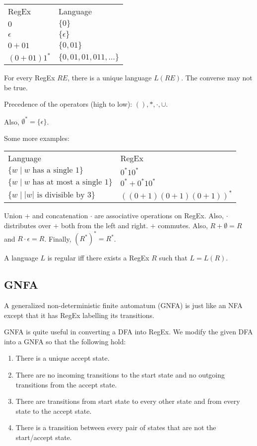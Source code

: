 \documentclass{article}
\begin{document}
\renewcommand*{\arraystretch}{1.4}  
\begin{center}
\begin{tabular}{ l  l  }
  RegEx & Language \\
  $0$ & $\{0 \}$ \\
  $\epsilon$ & $\{\epsilon\}$ \\
  $0+ 01$ & $\{0, 01\}$ \\
  $(0+01)1^{*}$ & $\{ 0, 01, 01, 011, \ldots \}$
  \end{tabular}
\end{center}

For every RegEx $RE$, there is a unique language $L(RE)$. The converse may not be true.

Precedence of the operators (high to low): $( ), *, \cdot, \cup$.

Also, $\emptyset^{*} = \{ \epsilon \}$.

Some more examples:

\renewcommand*{\arraystretch}{1.4}  
\begin{center}
\begin{tabular}{ l  l  }
  Language & RegEx \\
  $\{ w \mid w \text{ has a single } 1 \}$ & $0^{*}10^{*}$ \\
  $\{ w \mid w \text{ has at most a single } 1 \}$ & $0^{*} + 0^{*}10^{*}$ \\
  $\{ w \mid |w| \text{ is divisible by } 3\} $ & $((0+1)(0+1)(0+1))^{*}$ \\
\end{tabular}
\end{center}

Union $+$ and concatenation $\cdot$ are associative operations on RegEx. Also, $\cdot$ distributes over $+$ both from the left and right. $+$ commutes. Also, $R + \emptyset = R$ and $R\cdot \epsilon = R$. Finally, $(R^*)^{*} = R^*$.

A language $L$ is regular iff there exists a RegEx $R$ such that $L = L(R)$.

\subsection{GNFA}

A generalized non-deterministic finite automatum (GNFA) is just like an NFA except that it has RegEx labelling its transitions.

GNFA is quite useful in converting a DFA into RegEx. We modify the given DFA into a GNFA so that the following hold: 
\begin{enumerate}
\item\label{item:13} There is a unique accept state. 
\item\label{item:14} There are no incoming transitions to the start state and no outgoing transitions from the accept state. 
\item\label{item:15} There are transitions from start state to every other state and from every state to the accept state. 
\item\label{item:16} There is a transition between every pair of states that are not the start/accept state.
\end{enumerate}
\end{document}
